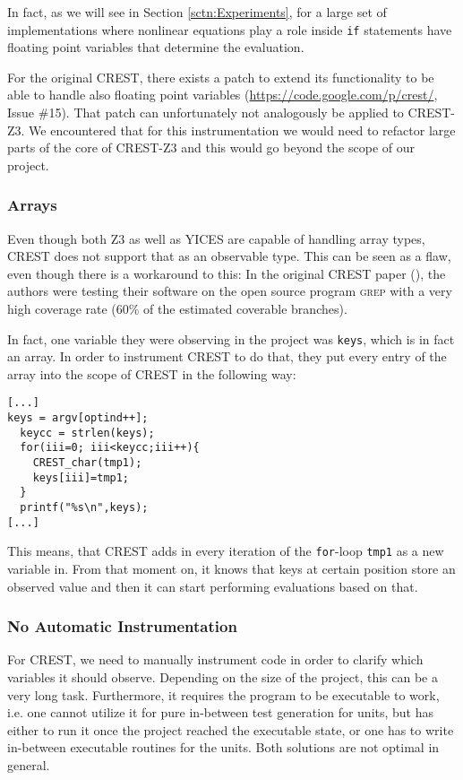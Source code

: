 \documentclass[oribibl]{llncs}
\begin{document}
In fact, as we will see in Section \ref{sctn:Experiments}, for a large set
of implementations where nonlinear equations play a role inside \texttt{if}
statements have floating point variables that determine the
evaluation.

For the original \textsc{CREST}, there exists a patch to extend its
functionality to be able to handle also floating point variables
(\url{https://code.google.com/p/crest/}, Issue \#15). That
patch can unfortunately not analogously be applied to
\textsc{CREST-Z3}. We encountered that for this instrumentation we
would need to refactor large parts of the core of \textsc{CREST-Z3}
and this would go beyond the scope of our project.

\subsubsection{Arrays}

Even though both \textsc{Z3} as well as \textsc{YICES} are capable of
handling array types, \textsc{CREST} does not support that as an
observable type. This can be seen as a flaw, even though there is a
workaround to this: In the original \textsc{CREST} paper
(\cite{CREST}), the authors were testing their software on the open
source program \textsc{grep} with a very high coverage rate (60\% of
the estimated coverable branches).

In fact, one variable they were observing in the project was \texttt{keys}, which is in fact an array. In order to
instrument \textsc{CREST} to do that, they put every entry of the
array into the scope of \textsc{CREST} in the following way:

\begin{verbatim}
[...]
keys = argv[optind++];
  keycc = strlen(keys);
  for(iii=0; iii<keycc;iii++){
    CREST_char(tmp1);
    keys[iii]=tmp1;
  }
  printf("%s\n",keys);
[...]
\end{verbatim}

This means, that \textsc{CREST} adds in every iteration of the
\texttt{for}-loop \texttt{tmp1} as a new variable in. From that moment on, it
knows that keys at certain position store an observed value and then
it can start performing evaluations based on that.

\subsubsection{No Automatic Instrumentation}

For \textsc{CREST}, we need to manually instrument code in order to
clarify which variables it should observe. Depending on the size of
the project, this can be a very long task.  Furthermore, it requires
the program to be executable to work, i.e. one cannot utilize it for
pure in-between test generation for units, but has either to run it once
the project reached the executable state, or one has to write in-between executable routines for the units. Both solutions are not
optimal in general.
\end{document}
